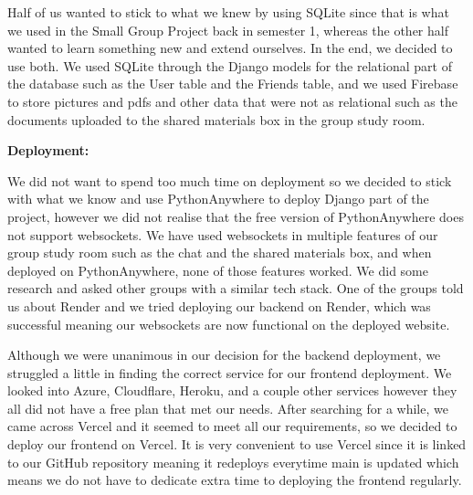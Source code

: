 Half of us wanted to stick to what we knew by using SQLite since that is what we used in the Small Group Project back in semester 1, whereas the other half wanted to learn something new and extend ourselves. In the end, we decided to use both. We used SQLite through the Django models for the relational part of the database such as the User table and the Friends table, and we used Firebase to store pictures and pdfs and other data that were not as relational such as the documents uploaded to the shared materials box in the group study room.

\textbf{Deployment:}

We did not want to spend too much time on deployment so we decided to stick with what we know and use PythonAnywhere to deploy Django part of the project, however we did not realise that the free version of PythonAnywhere does not support websockets. We have used websockets in multiple features of our group study room such as the chat and the shared materials box, and when deployed on PythonAnywhere, none of those features worked. We did some research and asked other groups with a similar tech stack. One of the groups told us about Render and we tried deploying our backend on Render, which was successful meaning our websockets are now functional on the deployed website.

Although we were unanimous in our decision for the backend deployment, we struggled a little in finding the correct service for our frontend deployment. We looked into Azure, Cloudflare, Heroku, and a couple other services however they all did not have a free plan that met our needs. After searching for a while, we came across Vercel and it seemed to meet all our requirements, so we decided to deploy our frontend on Vercel. It is very convenient to use Vercel since it is linked to our GitHub repository meaning it redeploys everytime main is updated which means we do not have to dedicate extra time to deploying the frontend regularly.
